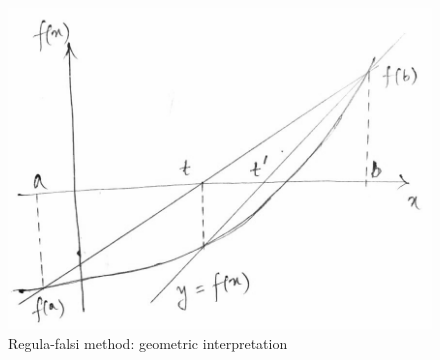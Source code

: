 \documentclass[a4paper,11pt]{book}
\begin{document}
\vspace{5mm}

\begin{figure}[ht]
	\centering
	\includegraphics[scale=0.26]{code/sort/pic/regulafalsi.jpeg}
	\caption{Regula-falsi method: geometric interpretation}
\end{figure}
\end{document}
